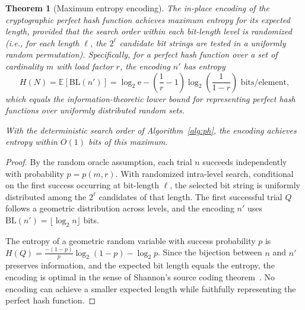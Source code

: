 \documentclass[hidelinks,11pt,final]{article}
\newcommand{\envnumstyle}{section}
\theoremstyle{plain}
\newtheorem{theorem}{Theorem}[\envnumstyle]
\begin{document}
\begin{theorem}[Maximum entropy encoding]
\label{thm:maxentropy}
The in-place encoding of the cryptographic perfect hash function achieves maximum entropy for its expected length, provided that the search order within each bit-length level is randomized (i.e., for each length $\ell$, the $2^\ell$ candidate bit strings are tested in a uniformly random permutation). Specifically, for a perfect hash function over a set of cardinality $m$ with load factor $r$, the encoding $n'$ has entropy
\begin{equation}
H(N) = \mathbb{E}[\mathrm{BL}(n')] = \log_2 \mathrm{e} - \left(\frac{1}{r} - 1\right) \log_2\!\left(\frac{1}{1-r}\right) \text{ bits/element},
\end{equation}
which equals the information-theoretic lower bound for representing perfect hash functions over uniformly distributed random sets.

With the deterministic search order of Algorithm~\ref{alg:ph}, the encoding achieves entropy within $O(1)$ bits of this maximum.
\end{theorem}
\begin{proof}
By the random oracle assumption, each trial $n$ succeeds independently with probability $p = p(m,r)$. With randomized intra-level search, conditional on the first success occurring at bit-length $\ell$, the selected bit string is uniformly distributed among the $2^\ell$ candidates of that length. The first successful trial $Q$ follows a geometric distribution across levels, and the encoding $n'$ uses $\mathrm{BL}(n') = \lfloor \log_2 n \rfloor$ bits.

The entropy of a geometric random variable with success probability $p$ is $H(Q) = \frac{-(1-p)}{p}\log_2(1-p) - \log_2 p$. Since the bijection between $n$ and $n'$ preserves information, and the expected bit length equals the entropy, the encoding is optimal in the sense of Shannon's source coding theorem~\cite{shannon,coverandthomas}. No encoding can achieve a smaller expected length while faithfully representing the perfect hash function.
\end{proof}
\end{document}
